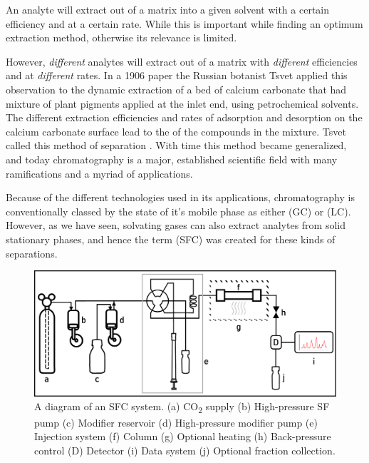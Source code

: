 An analyte will extract out of a matrix into a given solvent with a certain
efficiency and at a certain rate. While this is important while finding an
optimum extraction method, otherwise its relevance is limited.

However, \textit{different} analytes will extract out of a matrix with
\textit{different} efficiencies and at \textit{different} rates. In a 1906 paper
the Russian botanist Tsvet applied this observation to the dynamic extraction of
a bed of calcium carbonate that had mixture of plant pigments applied at the
inlet end, using petrochemical solvents. The different extraction efficiencies
and rates of adsorption and desorption on the calcium carbonate surface lead to
the  of the compounds in the mixture. Tsvet called this
method of separation  \autocite{Ettre1993,Ettre1993a}.
With time this method became generalized, and today chromatography is a major,
established scientific field with many ramifications and a myriad of
applications.

Because of the different technologies used in its applications, chromatography
is conventionally classed by the state of it's mobile phase as either
 (GC) or  (LC).
However, as we have seen, solvating gases can also extract analytes from solid
stationary phases, and hence the term  (SFC) was created for these kinds of separations.

\begin{figure}
\centering
\includegraphics[width=\textwidth]{Figures/SFC_System}
\decoRule
\caption[SFC system diagram]{A diagram of an SFC system. (a) CO\textsubscript{2}
supply (b) High-pressure SF pump (c) Modifier reservoir (d) High-pressure
modifier pump (e) Injection system (f) Column (g) Optional heating (h)
Back-pressure control (D) Detector (i) Data system (j) Optional fraction
collection.}
\label{fig:sfcdiagram}

\end{figure}


